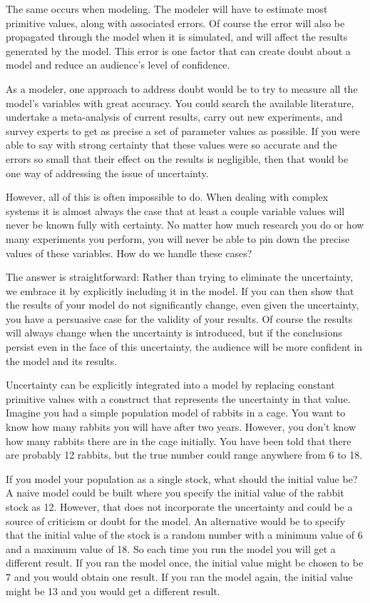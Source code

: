 \documentclass[]{memoir}
\begin{document}
The same occurs when modeling. The modeler will have to estimate most
primitive values, along with associated errors. Of course the error will
also be propagated through the model when it is simulated, and will
affect the results generated by the model. This error is one factor that
can create doubt about a model and reduce an audience's level of
confidence.

As a modeler, one approach to address doubt would be to try to measure
all the model's variables with great accuracy. You could search the
available literature, undertake a meta-analysis of current results,
carry out new experiments, and survey experts to get as precise a set of
parameter values as possible. If you were able to say with strong
certainty that these values were so accurate and the errors so small
that their effect on the results is negligible, then that would be one
way of addressing the issue of uncertainty.

However, all of this is often impossible to do. When dealing with
complex systems it is almost always the case that at least a couple
variable values will never be known fully with certainty. No matter how
much research you do or how many experiments you perform, you will never
be able to pin down the precise values of these variables. How do we
handle these cases?

The answer is straightforward: Rather than trying to eliminate the
uncertainty, we embrace it by explicitly including it in the model. If
you can then show that the results of your model do not significantly
change, even given the uncertainty, you have a persuasive case for the
validity of your results. Of course the results will always change when
the uncertainty is introduced, but if the conclusions persist even in
the face of this uncertainty, the audience will be more confident in the
model and its results.

Uncertainty can be explicitly integrated into a model by replacing
constant primitive values with a construct that represents the
uncertainty in that value. Imagine you had a simple population model of
rabbits in a cage. You want to know how many rabbits you will have after
two years. However, you don't know how many rabbits there are in the
cage initially. You have been told that there are probably 12 rabbits,
but the true number could range anywhere from 6 to 18.

If you model your population as a single stock, what should the initial
value be? A naive model could be built where you specify the initial
value of the rabbit stock as 12. However, that does not incorporate the
uncertainty and could be a source of criticism or doubt for the model.
An alternative would be to specify that the initial value of the stock
is a random number with a minimum value of 6 and a maximum value of 18.
So each time you run the model you will get a different result. If you
ran the model once, the initial value might be chosen to be 7 and you
would obtain one result. If you ran the model again, the initial value
might be 13 and you would get a different result.
\end{document}
